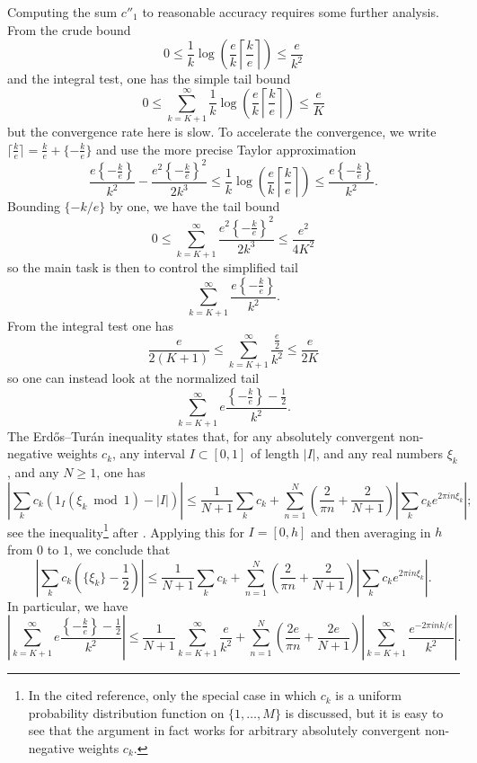 \documentclass[10pt,a4paper,reqno]{amsart}
\numberwithin{equation}{section}
\theoremstyle{plain}
\theoremstyle{definition}
\renewcommand{\mod}{\bmod}
\begin{document}
Computing the sum $c''_1$ to reasonable accuracy requires some further analysis.  From the crude bound
$$0 \leq \frac{1}{k} \log\left(\frac{e}{k} \left\lceil \frac{k}{e} \right\rceil\right) \leq \frac{e}{k^2}$$
and the integral test, one has the simple tail bound
$$ 0 \leq \sum_{k=K+1}^\infty \frac{1}{k} \log\left(\frac{e}{k} \left\lceil \frac{k}{e} \right\rceil\right) \leq \frac{e}{K}$$
but the convergence rate here is slow.  To accelerate the convergence, we write $\lceil\frac{k}{e} \rceil = \frac{k}{e} + \{-\frac{k}{e}\}$ and use the more precise Taylor approximation
$$ \frac{e \left\{-\frac{k}{e}\right\}}{k^2} - \frac{e^2 \left\{-\frac{k}{e}\right\}^2}{2k^3} 
\leq \frac{1}{k} \log\left(\frac{e}{k} \left\lceil \frac{k}{e} \right\rceil\right) \leq \frac{e \left\{-\frac{k}{e}\right\}}{k^2}.$$
Bounding $\{-k/e\}$ by one, we have the tail bound
$$ 0 \leq \sum_{k=K+1}^\infty \frac{e^2 \left\{-\frac{k}{e}\right\}^2}{2k^3} \leq \frac{e^2}{4K^2}$$
so the main task is then to control the simplified tail
$$ \sum_{k=K+1}^\infty \frac{e\left\{-\frac{k}{e}\right\}}{k^2}.$$
From the integral test one has
$$ \frac{e}{2(K+1)} \leq \sum_{k=K+1}^\infty \frac{\frac{e}{2}}{k^2} \leq \frac{e}{2K}$$
so one can instead look at the normalized tail
$$ \sum_{k=K+1}^\infty e\frac{\left\{-\frac{k}{e}\right\}-\frac{1}{2}}{k^2}.$$
The Erd\H{o}s--Tur\'an inequality states that, for any absolutely convergent non-negative weights $c_k$, any interval $I \subset [0,1]$ of length $|I|$, and any real numbers $\xi_k$, and any $N \geq 1$, one has
$$ \left|\sum_k c_k (1_I(\xi_k \mod 1) - |I|)\right| \leq \frac{1}{N+1} \sum_k c_k + \sum_{n=1}^N \left(\frac{2}{\pi n} + \frac{2}{N+1}\right) \left|\sum_k c_k e^{2\pi i n \xi_k}\right|;$$
see the inequality\footnote{In the cited reference, only the special case in which $c_k$ is a uniform probability distribution function on $\{1,\dots,M\}$ is discussed, but it is easy to see that the argument in fact works for arbitrary absolutely convergent non-negative weights $c_k$.} after \cite[Theorem 20]{vaaler}.  Applying this for $I = [0,h]$ and then averaging in $h$ from $0$ to $1$, we conclude that
$$ \left|\sum_k c_k \left(\{\xi_k\}-\frac{1}{2}\right)\right| \leq \frac{1}{N+1} \sum_k c_k + \sum_{n=1}^N \left(\frac{2}{\pi n} + \frac{2}{N+1}\right) \left|\sum_k c_k e^{2\pi i n \xi_k}\right|.$$
In particular, we have
$$ \left| \sum_{k=K+1}^\infty e\frac{\left\{-\frac{k}{e}\right\}-\frac{1}{2}}{k^2}\right| \leq \frac{1}{N+1} \sum_{k=K+1}^\infty \frac{e}{k^2}
+ \sum_{n=1}^N \left(\frac{2e}{\pi n} + \frac{2e}{N+1}\right) \left|\sum_{k=K+1}^\infty \frac{e^{-2\pi i n k/e}}{k^2}\right|.
$$
\end{document}
